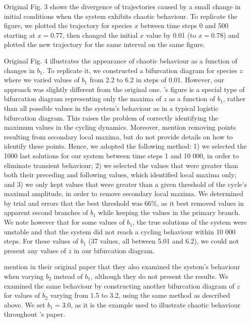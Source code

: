 Original Fig. 3 shows the divergence of trajectories caused by a small change in initial
conditions when the system exhibits chaotic behaviour.
To replicate the figure, we plotted the trajectory for species $x$ between time steps 0
and 500 starting at $x = 0.77$, then changed the initial $x$ value by 0.01 (to $x = 0.78$)
and plotted the new trajectory for the same interval on the same figure.

Original Fig. 4 illustrates the appearance of chaotic behaviour as a function of changes in
$b_1$. To replicate it, we constructed a bifurcation diagram for species $z$ where we
varied values of $b_1$ from 2.2 to 6.2 in steps of 0.01.
However, our approach was slightly different from the original one.
\citeauthor{hastings1991}'s figure is a special type of bifurcation diagram
representing only the maxima of $z$ as a function of $b_1$, rather than all possible
values in the system's behaviour as in a typical logistic bifurcation diagram.
This raises the problem of correctly identifying the maximum values in the cycling
dynamics. Moreover, \citeauthor{hastings1991} mention removing points resulting from
secondary local maxima, but do not provide details on how to identify these points.
Hence, we adopted the following method:
1) we selected the 1000 last solutions for our system between time steps 1 and 10 000, in
order to eliminate transient behaviour;
2) we selected the values that were greater than both their preceding and following
values, which identified local maxima only;
and 3) we only kept values that were greater than a given threshold of the cycle's maximal
amplitude, in order to remove secondary local maxima.
We determined by trial and errors that the best threshold was 66\%, as it best removed
values in apparent second branches of $b_1$ while keeping the values in the primary
branch. We note however that for some values of $b_1$, the true solutions of the system
were unstable and that the system did not reach a cycling behaviour within 10 000 steps.
For these values of $b_1$ (37 values, all between 5.01 and 6.2), we could not present any
values of $z$ in our bifurcation diagram.

\citeauthor{hastings1991} mention in their original paper that they also examined the system's
behaviour when varying $b_2$ instead of $b_1$, although they do not present the results.
We examined the same behaviour by constructing another bifurcation diagram of $z$ for
values of $b_2$ varying from 1.5 to 3.2, using the same method as described above.
We set $b_1 = 3.0$, as it is the example used to illustrate chaotic behaviour throughout
\citeauthor{hastings1991}'s paper.


